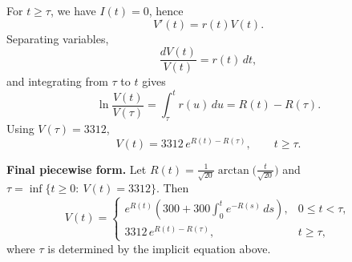 \documentclass{article}
\begin{document}
\begin{enumerate}
For $t\ge\tau$, we have $I(t)=0$, hence
\[
V'(t)=r(t)V(t).
\]
Separating variables,
\[
\frac{dV(t)}{V(t)}=r(t)\,dt,
\]
and integrating from $\tau$ to $t$ gives
\[
\ln\frac{V(t)}{V(\tau)}=\int_\tau^t r(u)\,du=R(t)-R(\tau).
\]
Using $V(\tau)=3312$,
\[
\boxed{
V(t)=3312\,e^{R(t)-R(\tau)},
\qquad t\ge \tau.
}
\]

\medskip
\noindent\textbf{Final piecewise form.}
Let $R(t)=\frac{1}{\sqrt{20}}\arctan\!\bigl(\frac{t}{\sqrt{20}}\bigr)$ and
$\tau=\inf\{t\ge 0:\ V(t)=3312\}$. Then
\[
\boxed{
V(t)=
\begin{cases}
\displaystyle
e^{R(t)}\left(300+300\int_0^t e^{-R(s)}\,ds\right),
& 0\le t<\tau,\\[1.25em]
\displaystyle
3312\,e^{R(t)-R(\tau)},
& t\ge\tau,
\end{cases}
}
\]
where $\tau$ is determined by the implicit equation above.
\end{enumerate}
\end{document}
